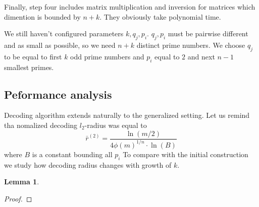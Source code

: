 \documentclass[12pt]{article}
\newtheorem{lemma}{Lemma}
\begin{document}
Finally, step four includes matrix multiplication and inversion for matrices which dimention is bounded by $n + k$. They obviously take polynomial time.

We still haven't configured parameters $k, q_{j}, p_{i}$. $q_{j}, p_{i}$ must be pairwise different and as small as possible, so we need $n+k$ distinct prime numbers. We choose $q_{j}$ to be equal to first $k$ odd prime numbers and $p_{i}$ equal to $2$ and next $n-1$ smallest primes.
\subsection{Peformance analysis}
Decoding algorithm extends naturally to the generalized setting. Let us remind tha nomalized decoding $l_{2}$-radius was equal to
\begin{equation}
    \bar r^{(2)} = \frac{\ln(m/2)}{4 \phi(m)^{1/n} \cdot \ln(B)}
\end{equation}
where $B$ is a constant bounding all $p_{i}$
To compare with the initial construction we study how decoding radius changes with growth of $k$.

\begin{lemma}

\end{lemma}
\begin{proof}

\end{proof}
\end{document}
